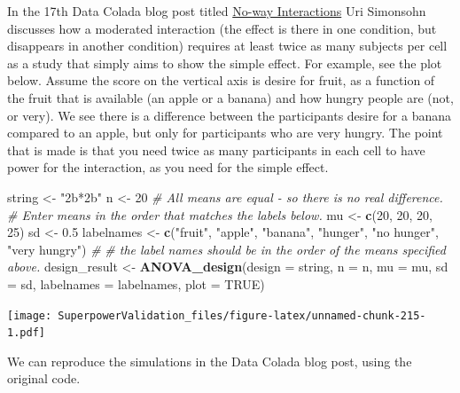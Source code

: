 \documentclass[]{book}
\newenvironment{Shaded}{\begin{snugshade}}{\end{snugshade}}
\newcommand{\CommentTok}[1]{\textcolor[rgb]{0.56,0.35,0.01}{\textit{#1}}}
\newcommand{\DataTypeTok}[1]{\textcolor[rgb]{0.13,0.29,0.53}{#1}}
\newcommand{\DecValTok}[1]{\textcolor[rgb]{0.00,0.00,0.81}{#1}}
\newcommand{\FloatTok}[1]{\textcolor[rgb]{0.00,0.00,0.81}{#1}}
\newcommand{\KeywordTok}[1]{\textcolor[rgb]{0.13,0.29,0.53}{\textbf{#1}}}
\newcommand{\NormalTok}[1]{#1}
\newcommand{\OtherTok}[1]{\textcolor[rgb]{0.56,0.35,0.01}{#1}}
\newcommand{\StringTok}[1]{\textcolor[rgb]{0.31,0.60,0.02}{#1}}
\begin{document}
In the 17th Data Colada blog post titled \href{http://datacolada.org/17}{No-way Interactions} Uri Simonsohn discusses how a moderated interaction (the effect is there in one condition, but disappears in another condition) requires at least twice as many subjects per cell as a study that simply aims to show the simple effect. For example, see the plot below. Assume the score on the vertical axis is desire for fruit, as a function of the fruit that is available (an apple or a banana) and how hungry people are (not, or very). We see there is a difference between the participants desire for a banana compared to an apple, but only for participants who are very hungry. The point that is made is that you need twice as many participants in each cell to have power for the interaction, as you need for the simple effect.

\begin{Shaded}
\begin{Highlighting}[]
\NormalTok{string <-}\StringTok{ "2b*2b"}
\NormalTok{n <-}\StringTok{ }\DecValTok{20}
\CommentTok{# All means are equal - so there is no real difference.}
\CommentTok{# Enter means in the order that matches the labels below.}
\NormalTok{mu <-}\StringTok{ }\KeywordTok{c}\NormalTok{(}\DecValTok{20}\NormalTok{, }\DecValTok{20}\NormalTok{, }\DecValTok{20}\NormalTok{, }\DecValTok{25}\NormalTok{) }
\NormalTok{sd <-}\StringTok{ }\FloatTok{0.5}
\NormalTok{labelnames <-}\StringTok{ }\KeywordTok{c}\NormalTok{(}\StringTok{"fruit"}\NormalTok{, }\StringTok{"apple"}\NormalTok{, }\StringTok{"banana"}\NormalTok{, }
                \StringTok{"hunger"}\NormalTok{, }\StringTok{"no hunger"}\NormalTok{, }\StringTok{"very hungry"}\NormalTok{) }\CommentTok{#}
\CommentTok{# the label names should be in the order of the means specified above.}
\NormalTok{design_result <-}\StringTok{ }\KeywordTok{ANOVA_design}\NormalTok{(}\DataTypeTok{design =}\NormalTok{ string,}
                   \DataTypeTok{n =}\NormalTok{ n, }
                   \DataTypeTok{mu =}\NormalTok{ mu, }
                   \DataTypeTok{sd =}\NormalTok{ sd, }
                   \DataTypeTok{labelnames =}\NormalTok{ labelnames,}
                   \DataTypeTok{plot =} \OtherTok{TRUE}\NormalTok{)}
\end{Highlighting}
\end{Shaded}

\texttt{[image: SuperpowerValidation\_files/figure-latex/unnamed-chunk-215-1.pdf]}

We can reproduce the simulations in the Data Colada blog post, using the original code.
\end{document}
